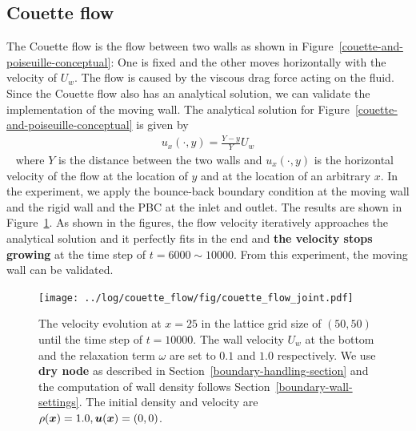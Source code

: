 \subsection{Couette flow}
The Couette flow is the flow between two walls as shown in
Figure~\ref{couette-and-poiseuille-conceptual}:
One is fixed and the other moves horizontally with the velocity of $U_w$.
The flow is caused by the viscous drag force acting on the fluid.
Since the Couette flow also has an analytical solution,
we can validate the implementation of the moving wall.
The analytical solution for Figure~\ref{couette-and-poiseuille-conceptual} is given by
\begin{equation}
\begin{aligned}
  u_x(\cdot, y) =\frac{Y - y}{Y}U_w
\end{aligned}
\end{equation}
~\cite{nagy2019graphical} where $Y$ is the distance between the two walls
and $u_x(\cdot, y)$ is the horizontal velocity of the flow
at the location of $y$ and at the location of
an arbitrary $x$. 
In the experiment, we apply the bounce-back boundary condition
at the moving wall and the rigid wall
and the PBC at the inlet and outlet.
The results are shown in Figure~\ref{fig:couette-velocity-evolution}.
As shown in the figures, the flow velocity iteratively approaches
the analytical solution and it perfectly fits in the end
and {\bf the velocity stops growing} at the time step of $t = 6000 \sim 10000$.
From this experiment, the moving wall can be validated.

\begin{figure}[H]
  \vspace{-1mm}
  \centering
  \texttt{[image: ../log/couette\_flow/fig/couette\_flow\_joint.pdf]}
  \vspace{-5mm}
  \caption{The velocity evolution at
  $x = 25$ in the lattice grid size of $(50, 50)$ until the time step of $t = 10000$.
  The wall velocity $U_w$ at the bottom and the relaxation term $\omega$ are set
  to $0.1$ and $1.0$ respectively.
  We use {\bf dry node} as described in Section~\ref{boundary-handling-section}
  and the computation of wall density follows Section~\ref{boundary-wall-settings}.
  The initial density and velocity are $\rho(\boldsymbol{x}) = 1.0, \boldsymbol{u}(\boldsymbol{x}) = (0, 0)$.
  \label{fig:couette-velocity-evolution}}
\end{figure}

